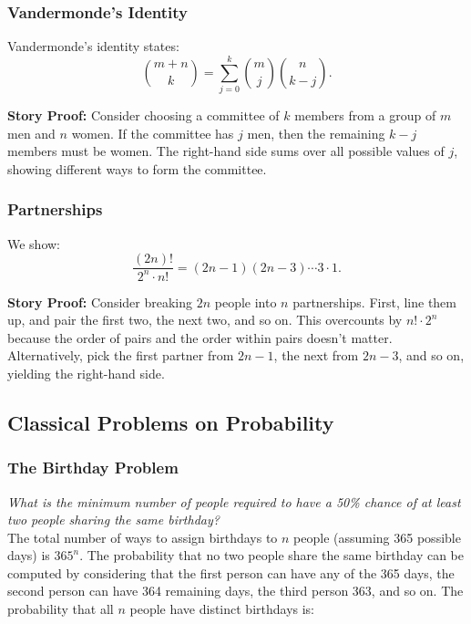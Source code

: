 \subsubsection{Vandermonde's Identity}

Vandermonde's identity states:
\[
\binom{m+n}{k} = \sum_{j=0}^{k} \binom{m}{j} \binom{n}{k-j}.
\]

\textbf{Story Proof:} Consider choosing a committee of \(k\) members from a group of \(m\) men and \(n\) women. If the committee has \(j\) men, then the remaining \(k-j\) members must be women. The right-hand side sums over all possible values of \(j\), showing different ways to form the committee.

\subsubsection{Partnerships}

We show:
\[
\frac{(2n)!}{2^n \cdot n!} = (2n-1)(2n-3) \cdots 3 \cdot 1.
\]

\textbf{Story Proof:} Consider breaking \(2n\) people into \(n\) partnerships. First, line them up, and pair the first two, the next two, and so on. This overcounts by \(n! \cdot 2^n\) because the order of pairs and the order within pairs doesn't matter. Alternatively, pick the first partner from \(2n-1\), the next from \(2n-3\), and so on, yielding the right-hand side.

\subsection{Classical Problems on Probability}

\subsubsection{The Birthday Problem}

\textit{What is the minimum number of people required to have a 50\% chance of at least two people sharing the same birthday?} \\

The total number of ways to assign birthdays to \(n\) people (assuming 365 possible days) is \(365^n\). The probability that no two people share the same birthday can be computed by considering that the first person can have any of the 365 days, the second person can have 364 remaining days, the third person 363, and so on. The probability that all \(n\) people have distinct birthdays is:

